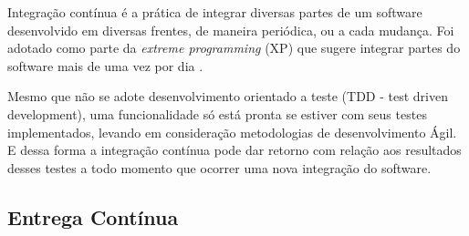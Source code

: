 Integração contínua é a prática de integrar diversas partes de um software
desenvolvido em diversas frentes, de maneira periódica, ou a cada mudança.
Foi adotado como parte da \textit{extreme programming} (XP) que sugere integrar
partes do software mais de uma vez por dia \cite{fowler2006continuous}.

Mesmo que não se adote desenvolvimento orientado a teste (TDD - test driven 
development), uma funcionalidade só está pronta se estiver com seus testes 
implementados, levando em consideração metodologias de desenvolvimento Ágil. 
E dessa forma a integração contínua pode dar retorno com relação aos resultados
desses testes a todo momento que ocorrer uma nova integração do software.

\subsection{Entrega Contínua}

